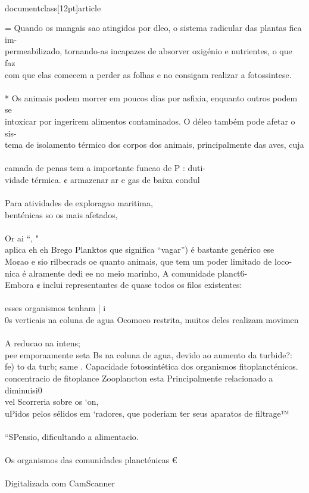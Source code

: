 \\documentclass[12pt]{article}
\begin{document}
= Quando os mangais sao atingidos por dleo, o sistema radicular das plantas fica im-\\
permeabilizado, tornando-as incapazes de absorver oxigénio e nutrientes, o que faz\\
com que elas comecem a perder as folhas e no consigam realizar a fotossintese.\\
\\
* Os animais podem morrer em poucos dias por asfixia, enquanto outros podem se\\
intoxicar por ingerirem alimentos contaminados. O déleo também pode afetar o sis-\\
tema de isolamento térmico dos corpos dos animais, principalmente das aves, cuja\\
\\
camada de penas tem a importante funcao de P : duti-\\
vidade térmica. ¢ armazenar ar e gas de baixa condul\\
\\
Para atividades de exploragao maritima,\\
benténicas so os mais afetados,\\
\\
Or ai “, "\\
aplica eh eh Brego Planktos que significa “vagar”) é bastante genérico ese\\
Mo¢ao e sio rilbecrads oe quanto animais, que tem um poder limitado de loco-\\
nica é alramente dedi ee no meio marinho, A comunidade planct6-\\
Embora ¢ inclui representantes de quase todos os filos existentes:\\
\\
esses organismos tenham | i\\
0s verticais na coluna de agua Ocomoco restrita, muitos deles realizam movimen\\
\\
A reducao na intens;\\
pee emporaamente seta Bs na coluna de agua, devido ao aumento da turbide?:\\
fe) to da turb; same . Capacidade fotossintética dos organismos fitoplancténicos.\\
concentracio de fitoplance Zooplancton esta Principalmente relacionado a diminuisi0\\
vel Scorreria sobre os ‘on, \\%
uPidos pelos sélidos em ‘radores, que poderiam ter seus aparatos de filtrage™\\
\\
“SPensio, dificultando a alimentacio.\\
\\
Os organismos das comunidades plancténicas €\\
\\
Digitalizada com CamScanner\\
\end{document}
